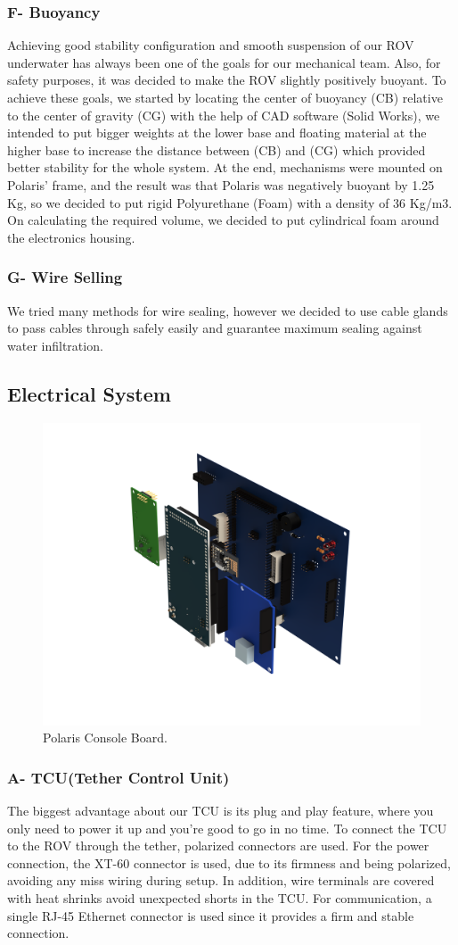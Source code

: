\documentclass[a4paper,12pt,leqno]{report}
\begin{document}
\textcolor{blue!40}{
\subsubsection{F- Buoyancy}}
Achieving good stability configuration and smooth suspension of our ROV underwater has  always been one of the goals for our mechanical team. Also, for safety purposes, it was  decided to make the ROV slightly positively buoyant. To achieve these goals, we started by  locating the center of buoyancy (CB) relative to the center of gravity (CG) with the help of CAD  software (Solid Works), we intended to put bigger weights at the lower base and floating  material at the higher base to increase the distance between (CB) and (CG) which provided better stability for the whole system. At the end, mechanisms were mounted on Polaris’ frame,  and the result was that Polaris was negatively buoyant by 1.25 Kg, so we decided to put rigid  Polyurethane (Foam) with a density of 36 Kg/m3. On calculating the required volume, we  decided to put cylindrical foam around the electronics housing. \\
\textcolor{blue!40}{
\subsubsection{G- Wire Selling}}
We tried many methods for wire sealing, however we decided to use cable glands to pass cables through safely easily and guarantee maximum sealing against water infiltration.
\vspace{3cm}
\textcolor{blue!90}{
\subsection{Electrical System}}
\begin{figure}
\centering
\includegraphics[width=.36\textwidth,height= .2\textheight]{console board (5)}
\caption{Polaris Console Board.}
\end{figure}
\textcolor{blue!40}{
\subsubsection{A- TCU(Tether Control Unit)}}
The biggest advantage about our TCU is its plug and play feature,  where you only need to power it up and you’re good to go in no time. 
To connect the TCU to the ROV through the tether, polarized  connectors are used. For the power connection, the XT-60 connector  is used, due to its firmness and being polarized, avoiding any miss wiring during setup. In addition, wire terminals are covered with heat shrinks avoid unexpected shorts in the TCU. For communication, a  single RJ-45 Ethernet connector is used since it provides a firm and  stable connection. 
\end{document}
